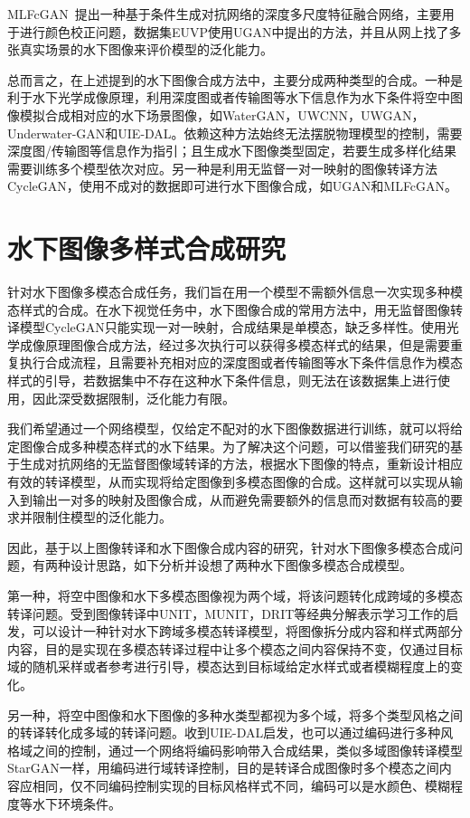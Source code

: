 MLFcGAN~\cite{liu2019mlfcgan}提出一种基于条件生成对抗网络的深度多尺度特征融合网络，主要用于进行颜色校正问题，数据集EUVP使用UGAN中提出的方法，并且从网上找了多张真实场景的水下图像来评价模型的泛化能力。

总而言之，在上述提到的水下图像合成方法中，主要分成两种类型的合成。一种是利于水下光学成像原理，利用深度图或者传输图等水下信息作为水下条件将空中图像模拟合成相对应的水下场景图像，如WaterGAN，UWCNN，UWGAN，Underwater-GAN和UIE-DAL。依赖这种方法始终无法摆脱物理模型的控制，需要深度图/传输图等信息作为指引；且生成水下图像类型固定，若要生成多样化结果需要训练多个模型依次对应。另一种是利用无监督一对一映射的图像转译方法CycleGAN，使用不成对的数据即可进行水下图像合成，如UGAN和MLFcGAN。

\section{水下图像多样式合成研究}\label{sec:03_3}
针对水下图像多模态合成任务，我们旨在用一个模型不需额外信息一次实现多种模态样式的合成。在水下视觉任务中，水下图像合成的常用方法中，用无监督图像转译模型CycleGAN只能实现一对一映射，合成结果是单模态，缺乏多样性。使用光学成像原理图像合成方法，经过多次执行可以获得多模态样式的结果，但是需要重复执行合成流程，且需要补充相对应的深度图或者传输图等水下条件信息作为模态样式的引导，若数据集中不存在这种水下条件信息，则无法在该数据集上进行使用，因此深受数据限制，泛化能力有限。

我们希望通过一个网络模型，仅给定不配对的水下图像数据进行训练，就可以将给定图像合成多种模态样式的水下结果。为了解决这个问题，可以借鉴我们研究的基于生成对抗网络的无监督图像域转译的方法，根据水下图像的特点，重新设计相应有效的转译模型，从而实现将给定图像到多模态图像的合成。这样就可以实现从输入到输出一对多的映射及图像合成，从而避免需要额外的信息而对数据有较高的要求并限制住模型的泛化能力。

因此，基于以上图像转译和水下图像合成内容的研究，针对水下图像多模态合成问题，有两种设计思路，如下分析并设想了两种水下图像多模态合成模型。

第一种，将空中图像和水下多模态图像视为两个域，将该问题转化成跨域的多模态转译问题。受到图像转译中UNIT，MUNIT，DRIT等经典分解表示学习工作的启发，可以设计一种针对水下跨域多模态转译模型，将图像拆分成内容和样式两部分内容，目的是实现在多模态转译过程中让多个模态之间内容保持不变，仅通过目标域的随机采样或者参考进行引导，模态达到目标域给定水样式或者模糊程度上的变化。

另一种，将空中图像和水下图像的多种水类型都视为多个域，将多个类型风格之间的转译转化成多域的转译问题。收到UIE-DAL启发，也可以通过编码进行多种风格域之间的控制，通过一个网络将编码影响带入合成结果，类似多域图像转译模型StarGAN一样，用编码进行域转译控制，目的是转译合成图像时多个模态之间内容应相同，仅不同编码控制实现的目标风格样式不同，编码可以是水颜色、模糊程度等水下环境条件。


